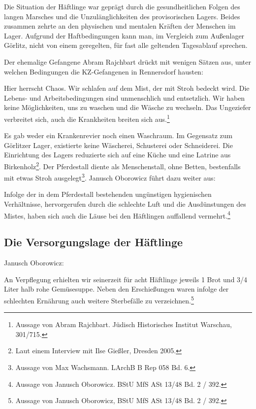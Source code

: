 
Die Situation der Häftlinge war geprägt durch die gesundheitlichen Folgen des langen Marsches und die Unzulänglichkeiten des provisorischen Lagers. Beides zusammen zehrte an den physischen und mentalen Kräften der Menschen im Lager. Aufgrund der Haftbedingungen kann man, im Vergleich zum Außenlager Görlitz, nicht von einem geregelten, für fast alle geltenden Tagesablauf sprechen. 

Der ehemalige Gefangene Abram Rajchbart drückt mit wenigen Sätzen aus, unter welchen Bedingungen die KZ-Gefangenen in Rennersdorf hausten:

\begin{leftbar} 
Hier herrscht Chaos. Wir schlafen auf dem Mist, der mit Stroh bedeckt wird. Die Lebens- und Arbeitsbedingungen sind unmenschlich und entsetzlich. Wir haben keine Möglichkeiten, uns zu waschen und die Wäsche zu wechseln. Das Ungeziefer verbreitet sich, auch die Krankheiten breiten sich aus.\footnote{Aussage von Abram Rajchbart. Jüdisch Historisches Institut Warschau, 301/715.}
\end{leftbar}

Es gab weder ein Krankenrevier noch einen Waschraum. Im Gegensatz zum Görlitzer Lager, existierte keine Wäscherei, Schusterei oder Schneiderei. Die Einrichtung des Lagers reduzierte sich auf eine Küche und eine Latrine aus Birkenholz\footnote{Laut einem Interview  mit Ilse Gießler, Dresden 2005.}. Der Pferdestall diente als \glqq Menschenstall\grqq, ohne Betten, bestenfalls mit etwas Stroh ausgelegt\footnote{Aussage von Max Wachsmann. LArchB B Rep 058 Bd. 6.}. Janusch Oborowicz führt dazu weiter aus:

\begin{leftbar} 
Infolge der in dem Pferdestall bestehenden ungünstigen hygienischen Verhältnisse, hervorgerufen durch die schlechte Luft und die Ausdünstungen des Mistes, haben sich auch die Läuse bei den Häftlingen auffallend vermehrt.\footnote{Aussage von Janusch Oborowicz. BStU MfS ASt 13/48 Bd. 2 / 392.}
\end{leftbar}




\subsection{Die Versorgungslage der Häftlinge}


Janusch Oborowicz:
\begin{leftbar} 
An Verpflegung erhielten wir seinerzeit für acht Häftlinge jeweils 1 Brot und 3/4 Liter halb rohe Gemüsesuppe. Neben den Erschießungen waren infolge der schlechten Ernährung auch weitere Sterbefälle zu verzeichnen.\footnote{Aussage von Janusch Oborowicz, BStU MfS ASt 13/48 Bd. 2 / 392.}
\end{leftbar}

